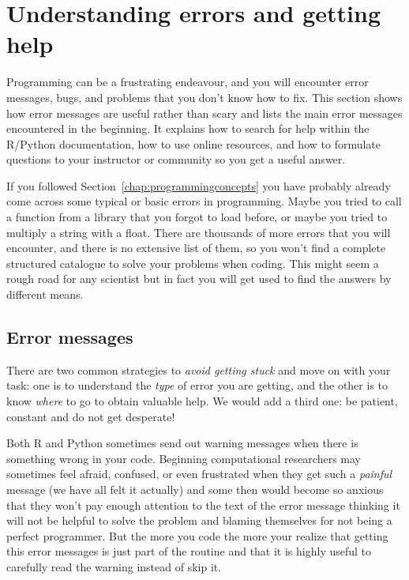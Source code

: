 \section{Understanding errors and getting help}
\label{sec:errors}

Programming can be a frustrating endeavour, and you will encounter error messages, bugs, and problems that you don’t know how to fix. This section shows how error messages are useful rather than scary and lists the main error messages encountered in the beginning. It explains how to search for help within the R/Python documentation, how to use online resources, and how to formulate questions to your instructor or community so you get a useful answer. 

If you followed Section~\ref{chap:programmingconcepts} you have probably already come across some typical or basic errors in programming. Maybe you tried to call a function from a library that you forgot to load before, or maybe you tried to multiply a string with a float.
There are thousands of more errors that you will encounter, and there is no extensive list of them, so you won't find a complete structured catalogue to solve your problems when coding. This might seem a rough road for any scientist but in fact you will get used to find the answers by different means.

\subsection{Error messages}


There are two common strategies to \textit{avoid getting stuck} and move on with your task: one is to understand the \textit{type} of error you are getting, and the other is to know \textit{where} to go to obtain valuable help. We would add a third one: be patient, constant and do not get desperate!

Both R and Python sometimes send out warning messages when there is something wrong in your code. Beginning computational researchers may sometimes feel afraid, confused, or even frustrated when they get such a \textit{painful} message (we have all felt it actually) and some then would become so anxious that they won't pay enough attention to the text of the error message thinking it will not be helpful to solve the problem and blaming themselves for not being a perfect programmer. But the more you code the more your realize that getting this error messages is just part of the routine and that it is highly useful to carefully read the warning instead of skip it.

